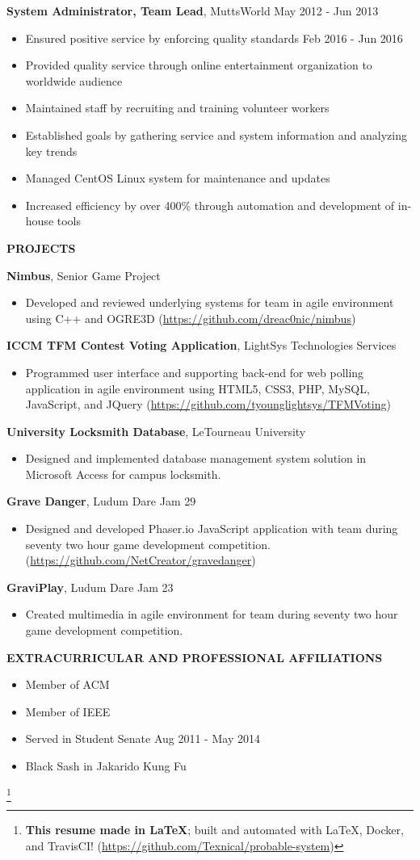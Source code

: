 \documentclass[letterpaper]{article}
\newcommand{\altsection}[1]{\noindent\textbf{#1}\smallskip}
\newcommand{\entry}[3]{\textbf{#1}, #2\begin{itemize}[leftmargin=3.5em]#3\end{itemize}\bigskip}
\newcommand\eol[1]{%
    \begingroup
    \renewcommand\thefootnote{}\footnote{#1}%
    \addtocounter{footnote}{-1}%
    \endgroup
}
\begin{document}
\entry{System Administrator, Team Lead}{MuttsWorld                             \hfill          May 2012 - Jun 2013}  {
    \item Ensured positive service by enforcing quality standards       \hfill          Feb 2016 - Jun 2016
    \item Provided quality service through online entertainment organization to worldwide audience
    \item Maintained staff by recruiting and training volunteer workers
    \item Established goals by gathering service and system information and analyzing key trends
    \item Managed CentOS Linux system for maintenance and updates
    \item Increased efficiency by over 400\% through automation and development of in-house tools
}

\altsection{PROJECTS}

\entry{Nimbus}{Senior Game Project} {
    \item Developed and reviewed underlying systems for team in agile environment using C++ and OGRE3D (\url{https://github.com/dreac0nic/nimbus})
}

\entry{ICCM TFM Contest Voting Application}{LightSys Technologies Services} {
    \item Programmed user interface and supporting back-end for web polling application in agile environment using HTML5, CSS3, PHP, MySQL, JavaScript, and JQuery (\url{https://github.com/tyounglightsys/TFMVoting})
}

\entry{University Locksmith Database}{LeTourneau University} {
    \item Designed and implemented database management system solution in Microsoft Access for campus locksmith.
}

\entry{Grave Danger}{Ludum Dare Jam 29} {
    \item Designed and developed Phaser.io JavaScript application with team during seventy two hour game development competition. (\url{https://github.com/NetCreator/gravedanger})
}

\entry{GraviPlay}{Ludum Dare Jam 23} {
    \item Created multimedia in agile environment for team during seventy two hour game development competition.
}

\altsection{EXTRACURRICULAR AND PROFESSIONAL AFFILIATIONS}

\begin{multicols}{2}
\begin{itemize}[leftmargin=3.5em]
\item Member of ACM
\item Member of IEEE
\item Served in Student Senate \hfill Aug 2011 - May 2014
\item Black Sash in Jakarido Kung Fu
\end{itemize}
\end{multicols}

\eol{\noindent\textbf{This resume made in \LaTeX{}}; built and automated with \LaTeX{}, Docker, and TravisCI! (\url{https://github.com/Texnical/probable-system})}
\end{document}
